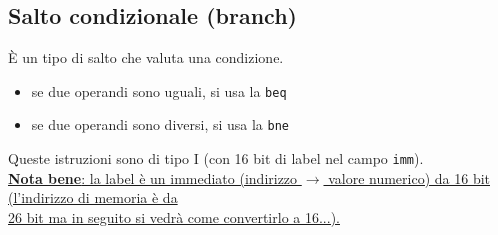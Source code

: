 \documentclass[../main.tex]{subfiles}
\begin{document}
\subsection{Salto condizionale (branch)}
È un tipo di salto che valuta una condizione.
\begin{itemize}
    \item se due operandi sono uguali, si usa la \texttt{beq}
    \item se due operandi sono diversi, si usa la \texttt{bne}
\end{itemize}

\vspace{2mm}

\noindent
Queste istruzioni sono di tipo I (con 16 bit di label nel campo
\texttt{imm}).
\\[2mm]
\underline{\textbf{Nota bene}: la label è un immediato (indirizzo
$\rightarrow$ valore numerico) da 16 bit (l'indirizzo di memoria è da} \\
\underline{26 bit ma in seguito si vedrà come convertirlo a 16...).}

\vspace*{2mm}
\end{document}
